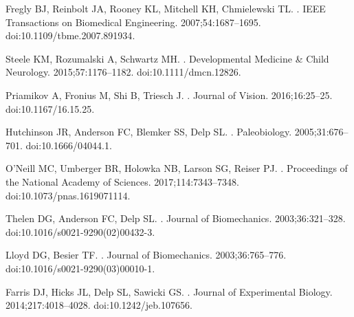 \documentclass[10pt,letterpaper]{article}
\begin{document}
% 

\begin{thebibliography}{10}

    Fregly BJ, Reinbolt JA, Rooney KL, Mitchell KH, Chmielewski TL.
    .
    \newblock IEEE Transactions on Biomedical Engineering. 2007;54:1687--1695.
    \newblock doi:{10.1109/tbme.2007.891934}.

    Steele KM, Rozumalski A, Schwartz MH.
    .
    \newblock Developmental Medicine \& Child Neurology. 2015;57:1176--1182.
    \newblock doi:{10.1111/dmcn.12826}.

    Priamikov A, Fronius M, Shi B, Triesch J.
    .
    \newblock Journal of Vision. 2016;16:25--25.
    \newblock doi:{10.1167/16.15.25}.

    Hutchinson JR, Anderson FC, Blemker SS, Delp SL.
    .
    \newblock Paleobiology. 2005;31:676--701.
    \newblock doi:{10.1666/04044.1}.

    O’Neill MC, Umberger BR, Holowka NB, Larson SG, Reiser PJ.
    .
    \newblock Proceedings of the National Academy of Sciences. 2017;114:7343--7348.
    \newblock doi:{10.1073/pnas.1619071114}.

    Thelen DG, Anderson FC, Delp SL.
    .
    \newblock Journal of Biomechanics. 2003;36:321--328.
    \newblock doi:{10.1016/s0021-9290(02)00432-3}.

    Lloyd DG, Besier TF.
    .
    \newblock Journal of Biomechanics. 2003;36:765--776.
    \newblock doi:{10.1016/s0021-9290(03)00010-1}.

    Farris DJ, Hicks JL, Delp SL, Sawicki GS.
    .
    \newblock Journal of Experimental Biology. 2014;217:4018--4028.
    \newblock doi:{10.1242/jeb.107656}.


\end{thebibliography}
\end{document}
